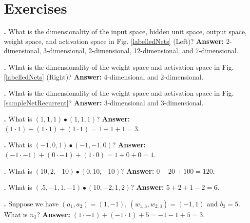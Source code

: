 \section{Exercises}\label{linear_algebra_exercises}


\noindent
{}
{\bf \theLinearAlgebraCounter.}  What is the dimensionality of the input space, hidden unit space, output space, weight space, and activation space in Fig. \ref{labelledNets} (Left)? 
{\bf Answer:} 2-dimensional, 3-dimensional, 2-dimensional, 12-dimensional, and 7-dimensional.
\bigskip

\noindent
{}
{\bf \theLinearAlgebraCounter.}  What is the dimensionality of the weight space and activation space in Fig. \ref{labelledNets} (Right)? 
{\bf Answer:} 4-dimensional and 2-dimensional.
\bigskip

\noindent
{}
{\bf \theLinearAlgebraCounter.}  What is the dimensionality of the weight space and activation space in Fig. \ref{sampleNetRecurrent}? 
{\bf Answer:} 3-dimensional and 3-dimensional.
\bigskip

\noindent
{}
{\bf \theLinearAlgebraCounter.}  What is $(1,1,1) \bullet  (1,1,1)$? 
{\bf Answer:}  $(1 \cdot 1) + (1 \cdot 1) + (1 \cdot 1) = 1 + 1 + 1 = 3$. 
\bigskip

\noindent
{}
{\bf \theLinearAlgebraCounter.}  What is $(-1,0,1) \bullet (-1,-1,0)$? 
{\bf Answer:} $(-1 \cdot -1) + (0 \cdot -1) + (1 \cdot 0) = 1 + 0 + 0 = 1$. 
\bigskip

\noindent
{}
{\bf \theLinearAlgebraCounter.}  What is $(10,2,-10) \bullet  (0,10,-10)$? 
{\bf Answer:}  $0 + 20 + 100 = 120$. 
\bigskip

\noindent
{}
{\bf \theLinearAlgebraCounter.}  What is $(.5,-1,1,-1) \bullet  (10,-2,1,2)$? 
{\bf Answer:}  $5 + 2 + 1 -2 = 6$. 
\bigskip

\noindent
{}
{\bf \theLinearAlgebraCounter.}  Suppose we have $(a_1,a_2) = (1,-1)$, $(w_{1,3}, w_{2,3})=(-1,1)$ and $b_3=5$. What is $n_3$? 
{\bf Answer:} $(1 \cdot -1) + (-1 \cdot 1) + 5 = -1 - 1 + 5 = 3$. 
\bigskip

